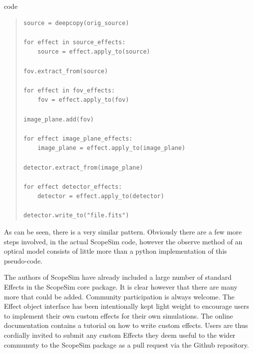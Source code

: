 \begin{DUclass}{code}
\begin{quote}
\begin{alltt}
\begin{lstlisting}[frame=single]
source = deepcopy(orig_source)

for effect in source_effects:
    source = effect.apply_to(source)

fov.extract_from(source)

for effect in fov_effects:
    fov = effect.apply_to(fov)

image_plane.add(fov)

for effect image_plane_effects:
    image_plane = effect.apply_to(image_plane)

detector.extract_from(image_plane)

for effect detector_effects:
    detector = effect.apply_to(detector)

detector.write_to("file.fits")
\end{lstlisting}
\end{alltt}
\end{quote}
\end{DUclass}

As can be seen, there is a very similar pattern.
Obviously there are a few more steps involved, in the actual ScopeSim code, however the \textquotedbl{}observe\textquotedbl{} method of an optical model consists of little more than a python implementation of this pseudo-code.


The authors of ScopeSim have already included a large number of standard Effects in the ScopeSim core package.
It is clear however that there are many more that could be added.
Community participation is always welcome.
The Effect object interface has been intentionally kept light weight to encourage users to implement their own custom effects for their own simulations.
The online documentation contains a tutorial on how to write custom effects.
Users are thus cordially invited to submit any custom Effects they deem useful to the wider communuty to the ScopeSim package as a pull request via the Github repository.
